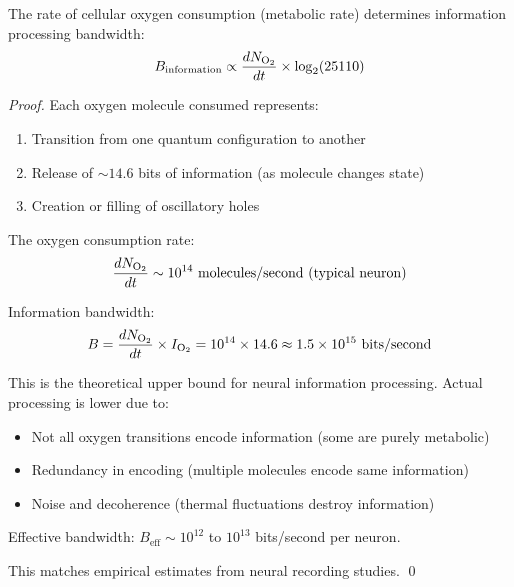 \begin{theorem}
\label{thm:oxygen_turnover}
The rate of cellular oxygen consumption (metabolic rate) determines information processing bandwidth:
\begin{equation}
B_{\text{information}} \propto \frac{dN_{\ce{O2}}}{dt} \times \log_2(25110)
\end{equation}
\end{theorem}

\begin{proof}
Each oxygen molecule consumed represents:
\begin{enumerate}
\item Transition from one quantum configuration to another
\item Release of $\sim 14.6$ bits of information (as molecule changes state)
\item Creation or filling of oscillatory holes
\end{enumerate}

The oxygen consumption rate:
\begin{equation}
\frac{dN_{\ce{O2}}}{dt} \sim 10^{14} \text{ molecules/second (typical neuron)}
\end{equation}

Information bandwidth:
\begin{equation}
B = \frac{dN_{\ce{O2}}}{dt} \times I_{\ce{O2}} = 10^{14} \times 14.6 \approx 1.5 \times 10^{15} \text{ bits/second}
\end{equation}

This is the theoretical upper bound for neural information processing. Actual processing is lower due to:
\begin{itemize}
\item Not all oxygen transitions encode information (some are purely metabolic)
\item Redundancy in encoding (multiple molecules encode same information)
\item Noise and decoherence (thermal fluctuations destroy information)
\end{itemize}

Effective bandwidth: $B_{\text{eff}} \sim 10^{12}$ to $10^{13}$ bits/second per neuron.

This matches empirical estimates from neural recording studies. \qed
\end{proof}
